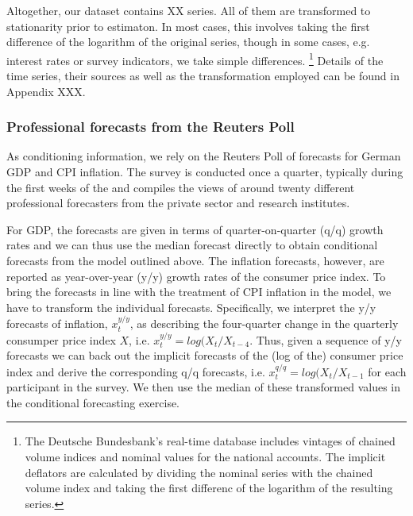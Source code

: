 \documentclass[notitlepage,a4paper,12pt]{article}
\begin{document}
Altogether, our dataset contains XX series. All of them are transformed to stationarity prior to estimaton. In most cases, this involves taking the first difference of the logarithm of the original series, though in some cases, e.g. interest rates or survey indicators, we take simple differences. \footnote{The Deutsche Bundesbank's real-time database includes vintages of chained volume indices and nominal values for the national accounts. The implicit deflators are calculated by dividing the nominal series with the chained volume index and taking the first differenc of the logarithm of the resulting series.} Details of the time series, their sources as well as the transformation employed  can be found in Appendix XXX.

\subsubsection{Professional forecasts from the Reuters Poll}

As conditioning information, we rely on the Reuters Poll of forecasts for German GDP and CPI inflation. The survey is conducted once a quarter, typically during the first weeks of the  and compiles the views of around twenty different professional forecasters from the private sector and research institutes. 

For GDP, the forecasts are given in terms of quarter-on-quarter (q/q) growth rates and we can thus use the median forecast directly to obtain conditional forecasts from the model outlined above. The inflation forecasts, however, are reported as year-over-year (y/y) growth rates of the consumer price index. To bring the forecasts in line with the treatment of CPI inflation in the model, we have to transform the individual forecasts. Specifically, we interpret the y/y forecasts of inflation, $x_t^{y/y}$, as describing the four-quarter change in the quarterly consumper price index $X$, i.e. $ x_t^{y/y} = log(X_t/X_{t-4}$. Thus, given a sequence of y/y forecasts we can back out the implicit forecasts of the (log of the) consumer price index and derive the corresponding q/q forecasts, i.e. $ x_t^{q/q} = log(X_t/X_{t-1}$ for each participant in the survey. We then use the median of these transformed values in the conditional forecasting exercise.
\end{document}
